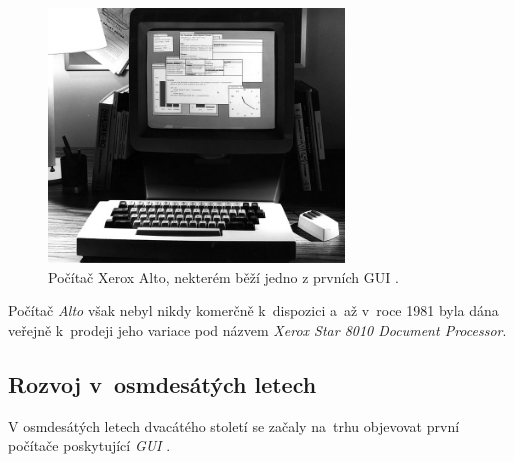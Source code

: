 \documentclass[11pt,twoside,a4paper]{book}
\begin{document}
\begin{figure}[!ht]
\begin{center}
  \includegraphics[width=0.7\textwidth]{figures/altost2}
\caption{{\label{fig:altoGUI}}Počítač Xerox Alto, nekterém běží jedno z prvních GUI \cite{bib:altoImage}.}
\end{center}
\end{figure}
Počítač \textit{Alto} však nebyl nikdy komerčně k~dispozici a~až v~roce 1981 byla dána veřejně k~prodeji jeho variace pod názvem \textit{Xerox Star 8010 Document Processor}.

\subsection{Rozvoj v~osmdesátých letech}
V osmdesátých letech dvacátého století se začaly na~trhu objevovat první počítače poskytující \textit{GUI} \cite{bib:history}.
\end{document}
